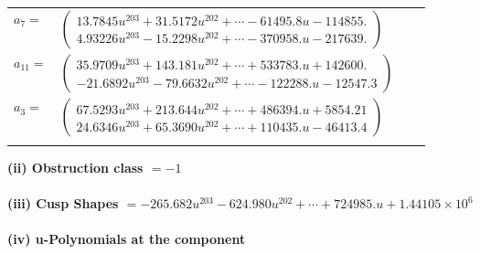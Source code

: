 \documentclass[1p]{elsarticle_modified}
\theoremstyle{definition}
\begin{document}
\begin{tabular}{m{7pt} m{180pt} m{7pt} m{180pt} }
\flushright $a_{7}=$&$\begin{pmatrix}13.7845 u^{203}+31.5172 u^{202}+\cdots-61495.8 u-114855.\\4.93226 u^{203}-15.2298 u^{202}+\cdots-370958. u-217639.\end{pmatrix}$ \\
\flushright $a_{11}=$&$\begin{pmatrix}35.9709 u^{203}+143.181 u^{202}+\cdots+533783. u+142600.\\-21.6892 u^{203}-79.6632 u^{202}+\cdots-122288. u-12547.3\end{pmatrix}$ \\
\flushright $a_{3}=$&$\begin{pmatrix}67.5293 u^{203}+213.644 u^{202}+\cdots+486394. u+5854.21\\24.6346 u^{203}+65.3690 u^{202}+\cdots+110435. u-46413.4\end{pmatrix}$\\&\end{tabular}
\flushleft \textbf{(ii) Obstruction class $= -1$}\\~\\
\flushleft \textbf{(iii) Cusp Shapes $= -265.682 u^{203}-624.980 u^{202}+\cdots+724985. u+1.44105\times10^{6}$}\\~\\
\newpage\renewcommand{\arraystretch}{1}
\flushleft \textbf{(iv) u-Polynomials at the component}\newline \\
\end{document}
